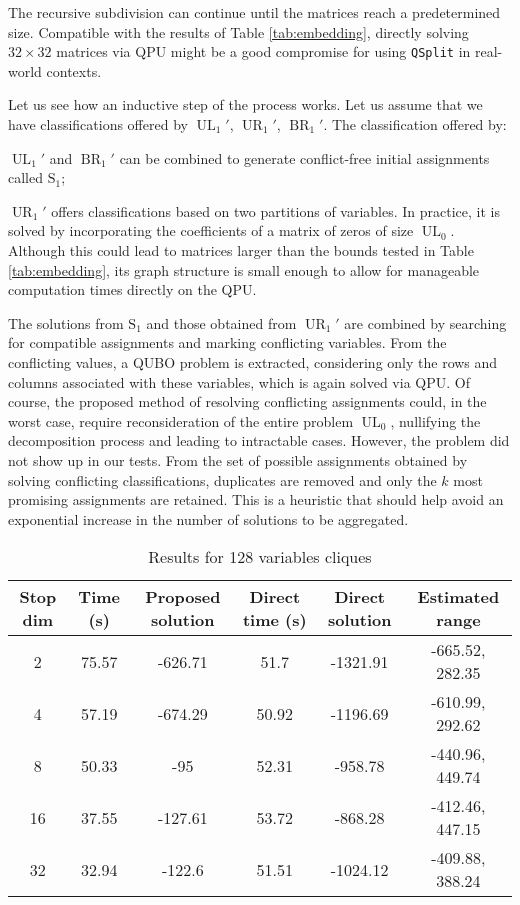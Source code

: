 \documentclass{ceurart}
\begin{document}
The recursive subdivision can continue until the matrices reach a predetermined size. Compatible with the results of Table \ref{tab:embedding}, directly solving $32 \times 32$ matrices via QPU might be a good compromise for using \verb|QSplit| in real-world contexts.

Let us see how an inductive step of the process works. Let us assume that we have classifications offered by $\operatorname{UL}_1'$, $\operatorname{UR}_1'$, $\operatorname{BR}_1'$. The classification offered by:
\begin{enumerate*}[label=\arabic*)]
    \item $\operatorname{UL}_1'$ and $\operatorname{BR}_1'$ can be combined to generate conflict-free initial assignments called $\operatorname{S_1}$;
    \item $\operatorname{UR}_1'$ offers classifications based on two partitions of variables. In practice, it is solved by incorporating the coefficients of a matrix of zeros of size $\operatorname{UL}_0$. Although this could lead to matrices larger than the bounds tested in Table \ref{tab:embedding}, its graph structure is small enough to allow for manageable computation times directly on the QPU.
\end{enumerate*}
The solutions from $\operatorname{S_1}$ and those obtained from $\operatorname{UR}_1'$ are combined by searching for compatible assignments and marking conflicting variables. From the conflicting values, a QUBO problem is extracted, considering only the rows and columns associated with these variables, which is again solved via QPU. Of course, the proposed method of resolving conflicting assignments could, in the worst case, require reconsideration of the entire problem \(\operatorname{UL}_0\), nullifying the decomposition process and leading to intractable cases. However, the problem did not show up in our tests. From the set of possible assignments obtained by solving conflicting classifications, duplicates are removed and only the $k$ most promising assignments are retained. This is a heuristic that should help avoid an exponential increase in the number of solutions to be aggregated.

\begin{table}
    \centering
    \begin{tabular}{cccccc}
        \toprule
        Stop dim & Time (s) & Proposed solution & Direct time (s) & Direct solution & Estimated range \\
        \midrule
        2 & 75.57 & -626.71 & 51.7 & -1321.91 & -665.52, 282.35 \\
        4 & 57.19 & -674.29 & 50.92 & -1196.69 & -610.99, 292.62 \\
        8 & 50.33 & -95 & 52.31 & -958.78 & -440.96, 449.74 \\
        16 & 37.55 & -127.61 & 53.72 & -868.28 & -412.46, 447.15 \\
        32 & 32.94 & -122.6 & 51.51 & -1024.12 & -409.88, 388.24 \\
        \bottomrule
    \end{tabular}
    \caption{Results for 128 variables cliques}
    \label{tab:qsplit}
\end{table}
\end{document}
